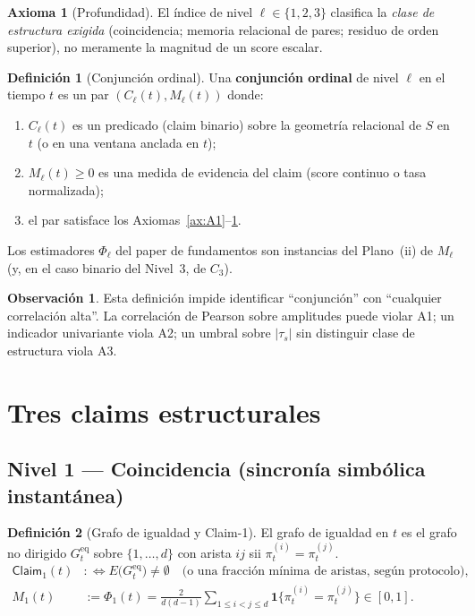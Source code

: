 \documentclass[11pt,a4paper]{article}
\theoremstyle{definition}
\newtheorem{definition}{Definici\'on}[section]
\newtheorem{axiom}{Axioma}[section]
\newtheorem{remark}{Observaci\'on}[section]
\theoremstyle{plain}
\theoremstyle{remark}
\newcommand{\claim}{\mathsf{Claim}}
\begin{document}
\begin{axiom}[Profundidad]
\label{ax:A3}
El \'indice de nivel $\ell\in\{1,2,3\}$ clasifica la \emph{clase de
estructura exigida} (coincidencia; memoria relacional de pares;
residuo de orden superior), no meramente la magnitud de un score
escalar.
\end{axiom}

\begin{definition}[Conjunci\'on ordinal]
\label{def:conjunction}
Una \textbf{conjunci\'on ordinal} de nivel $\ell$ en el tiempo $t$ es un
par $(C_\ell(t), M_\ell(t))$ donde:
\begin{enumerate}[label=(\roman*)]
  \item $C_\ell(t)$ es un predicado (claim binario) sobre la geometr\'ia
  relacional de $S$ en $t$ (o en una ventana anclada en $t$);
  \item $M_\ell(t)\ge 0$ es una medida de evidencia del claim
  (score continuo o tasa normalizada);
  \item el par satisface los Axiomas~\ref{ax:A1}--\ref{ax:A3}.
\end{enumerate}
Los estimadores $\Phi_\ell$ del paper de fundamentos son instancias del
Plano~(ii) de $M_\ell$ (y, en el caso binario del Nivel~3, de $C_3$).
\end{definition}

\begin{remark}
Esta definici\'on impide identificar ``conjunci\'on'' con ``cualquier
correlaci\'on alta''. La correlaci\'on de Pearson sobre amplitudes puede
violar A1; un indicador univariante viola A2; un umbral sobre $|\tau_s|$
sin distinguir clase de estructura viola A3.
\end{remark}

\section{Tres claims estructurales}
\label{sec:claims}

\subsection{Nivel 1 --- Coincidencia (sincron\'ia simb\'olica instant\'anea)}

\begin{definition}[Grafo de igualdad y Claim-1]
\label{def:L1}
El grafo de igualdad en $t$ es el grafo no dirigido $G_t^{\mathrm{eq}}$
sobre $\{1,\ldots,d\}$ con arista $ij$ sii $\pi_t^{(i)}=\pi_t^{(j)}$.
\begin{align}
\label{eq:C1}
\claim_1(t)
&:\iff E\bigl(G_t^{\mathrm{eq}}\bigr)\ne\emptyset
\quad\text{(o una fracci\'on m\'inima de aristas, seg\'un protocolo),}\\
\label{eq:M1}
M_1(t)
&:=\Phi_1(t)
=\frac{2}{d(d-1)}\sum_{1\le i<j\le d}
\mathbf{1}\{\pi_t^{(i)}=\pi_t^{(j)}\}\in[0,1].
\end{align}
\end{definition}
\end{document}

